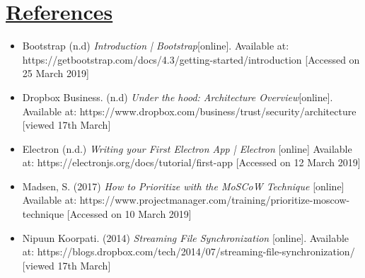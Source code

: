 \documentclass{article}
\begin{document}
\section{\underline{References}}
\begin{itemize}
\item Bootstrap (n.d) \textit{Introduction | Bootstrap}[online].  Available at: https://getbootstrap.com/docs/4.3/getting-started/introduction [Accessed on 25 March 2019]
\item Dropbox Business. (n.d) \textit{Under the hood: Architecture Overview}[online].  Available at: https://www.dropbox.com/business/trust/security/architecture [viewed 17th March]
\item Electron (n.d.) \textit{Writing your First Electron App | Electron} [online] Available at: https://electronjs.org/docs/tutorial/first-app [Accessed on 12 March 2019]
\item Madsen, S. (2017) \textit{How to Prioritize with the MoSCoW Technique} [online] Available at: https://www.projectmanager.com/training/prioritize-moscow-technique [Accessed on 10 March 2019]
\item Nipuun Koorpati. (2014) \textit{Streaming File Synchronization } [online]. Available at: https://blogs.dropbox.com/tech/2014/07/streaming-file-synchronization/ [viewed 17th March]
\end{itemize}
\end{document}
